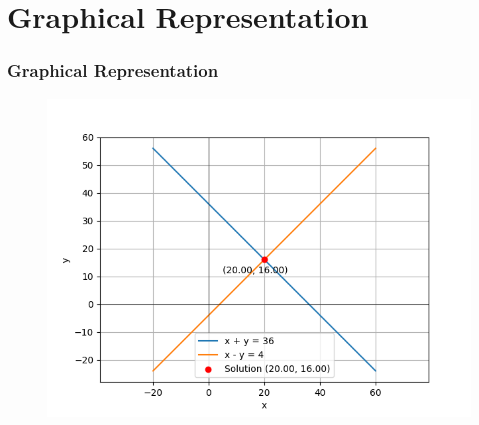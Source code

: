 \documentclass{beamer}
\numberwithin{equation}{section}
\begin{document}
\section{Graphical Representation}
\begin{frame}
\frametitle{Graphical Representation}
\begin{figure}[h]
    \centering
    \includegraphics[width=0.8\linewidth]{figs/fig.png}
\end{figure}
\end{frame}
\end{document}
